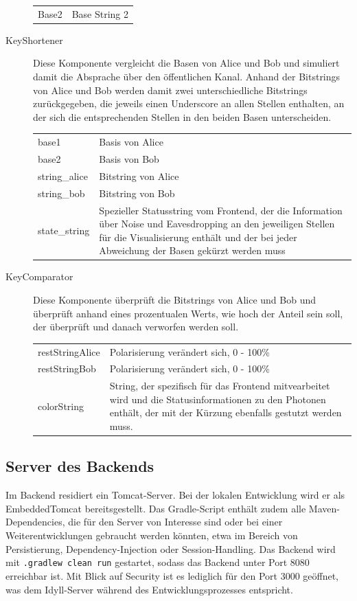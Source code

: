 \documentclass[a4paper,10.2pt,pdftex]{scrartcl}%
\begin{document}
\begin{description}
\begin{tabular}{p{3cm}p{9cm}}
Base2 & Base String 2  
\end{tabular}
\item[KeyShortener] 
Diese Komponente vergleicht die Basen von Alice und Bob und simuliert damit die Absprache über den öffentlichen Kanal. Anhand der Bitstrings von Alice und Bob werden damit zwei unterschiedliche Bitstrings zurückgegeben, die jeweils einen Underscore an allen Stellen enthalten, an der sich die entsprechenden Stellen in den beiden Basen unterscheiden. 
\\
\begin{tabular}{p{3cm}p{7.5cm}}
base1  & Basis von Alice \\
base2  & Basis von Bob \\
string\_alice &  Bitstring von Alice \\
string\_bob & Bitstring von Bob \\ 
state\_string & Spezieller Statusstring vom Frontend, der die Information über Noise und Eavesdropping an den jeweiligen Stellen für die Visualisierung enthält und der bei jeder Abweichung der Basen gekürzt werden muss \\
\end{tabular} 
\item[KeyComparator] 
Diese Komponente überprüft die Bitstrings von Alice und Bob und überprüft anhand eines prozentualen Werts, wie hoch der Anteil sein soll, der überprüft und danach verworfen werden soll. \\
\begin{tabular}{p{3cm}p{7.5cm}}
restStringAlice  & Polarisierung verändert sich, 0 - 100\% \\
restStringBob & Polarisierung verändert sich, 0 - 100\% \\
colorString & String, der spezifisch für das Frontend mitvearbeitet wird und die Statusinformationen zu den Photonen enthält, der mit der Kürzung ebenfalls gestutzt werden muss. 
\end{tabular} 
\end{description}


\subsection{Server des Backends}
Im Backend residiert ein Tomcat-Server. Bei der lokalen Entwicklung wird er als EmbeddedTomcat bereitsgestellt. Das Gradle-Script enthält zudem alle Maven-Dependencies, die für den Server von Interesse sind oder bei einer Weiterentwicklungen gebraucht werden könnten, etwa im Bereich von Persistierung, Dependency-Injection oder Session-Handling. Das Backend wird mit \texttt{.gradlew clean run} gestartet, sodass das Backend unter Port 8080 erreichbar ist. Mit Blick auf Security ist es lediglich für den Port 3000 geöffnet, was dem Idyll-Server während des Entwicklungsprozesses entspricht. 
\end{document}
